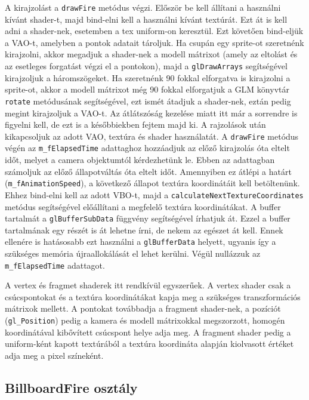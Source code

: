 A kirajzolást a \texttt{drawFire} metódus végzi. Először be kell állítani a használni kívánt shader-t, majd bind-elni kell a használni kívánt textúrát. Ezt át is kell adni a shader-nek, esetemben a tex uniform-on keresztül. Ezt követően bind-eljük a VAO-t, amelyben a pontok adatait tároljuk. Ha csupán egy sprite-ot szeretnénk kirajzolni, akkor megadjuk a shader-nek a modell mátrixot (amely az eltolást és az esetleges forgatást végzi el a pontokon), majd a \texttt{glDrawArrays} segítségével kirajzoljuk a háromszögeket. Ha szeretnénk 90 fokkal elforgatva is kirajzolni a sprite-ot, akkor a modell mátrixot még 90 fokkal elforgatjuk a GLM könyvtár \texttt{rotate} metódusának segítségével, ezt ismét átadjuk a shader-nek, eztán pedig megint kirajzoljuk a VAO-t. Az átlátszóság kezelése miatt itt már a sorrendre is figyelni kell, de ezt is a későbbiekben fejtem majd ki. A rajzolások után kikapcsoljuk az adott VAO, textúra és shader használatát. A \texttt{drawFire} metódus végén az \texttt{m\_fElapsedTime} adattaghoz hozzáadjuk az előző kirajzolás óta eltelt időt, melyet a camera objektumtól kérdezhetünk le. Ebben az adattagban számoljuk az előző állapotváltás óta eltelt időt. Amennyiben ez átlépi a határt (\texttt{m\_fAnimationSpeed}), a következő állapot textúra koordinátáit kell betöltenünk. Ehhez bind-elni kell az adott VBO-t, majd a \texttt{calculateNextTextureCoordinates} metódus segítségével előállítani a megfelelő textúra koordinátákat. A buffer tartalmát a \texttt{glBufferSubData} függvény segítségével írhatjuk át. Ezzel a buffer tartalmának egy részét is át lehetne írni, de nekem az egészet át kell. Ennek ellenére is hatásosabb ezt használni a \texttt{glBufferData} helyett, ugyanis így a szükséges memória újraallokálását el lehet kerülni. Végül nullázzuk az \texttt{m\_fElapsedTime} adattagot.

A vertex és fragmet shaderek itt rendkívül egyszerűek. A vertex shader csak a csúcspontokat és a textúra koordinátákat kapja meg a szükséges transzformációs mátrixok mellett. A pontokat továbbadja a fragment shader-nek, a pozíciót (\texttt{gl\_Position}) pedig a kamera és modell mátrixokkal megszorzott, homogén koordinátával kibővített csúcspont helye adja meg. A fragment shader pedig a uniform-ként kapott textúrából a textúra koordináta alapján kiolvasott értéket adja meg a pixel színeként. 


\subsection{BillboardFire osztály}

